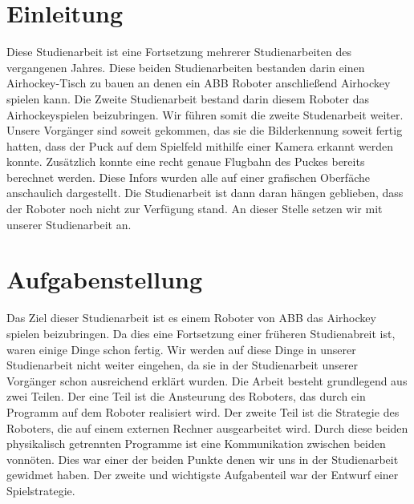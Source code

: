 
\chapter{Einleitung}
Diese Studienarbeit ist eine Fortsetzung mehrerer Studienarbeiten des vergangenen Jahres. Diese beiden Studienarbeiten bestanden darin einen Airhockey-Tisch zu bauen an denen ein ABB Roboter anschließend Airhockey spielen kann. Die Zweite Studienarbeit bestand darin diesem Roboter das Airhockeyspielen beizubringen. Wir führen somit die zweite Studenarbeit weiter. Unsere Vorgänger sind soweit gekommen, das sie die Bilderkennung soweit fertig hatten, dass der Puck auf dem Spielfeld mithilfe einer Kamera erkannt werden konnte. Zusätzlich konnte eine recht genaue Flugbahn des Puckes bereits berechnet werden. Diese Infors wurden alle auf einer grafischen Oberfäche anschaulich dargestellt. Die Studienarbeit ist dann daran hängen geblieben, dass der Roboter noch nicht zur Verfügung stand. An dieser Stelle setzen wir mit unserer Studienarbeit an.

\newpage

\chapter{Aufgabenstellung}
Das Ziel dieser Studienarbeit ist es einem Roboter von ABB das Airhockey spielen beizubringen. Da dies eine Fortsetzung einer früheren Studienabreit ist, waren einige Dinge schon fertig. Wir werden auf diese Dinge in unserer Studienarbeit nicht weiter eingehen, da sie in der Studienarbeit unserer Vorgänger schon ausreichend erklärt wurden. Die Arbeit besteht grundlegend aus zwei Teilen. Der eine Teil ist die Ansteurung des Roboters, das durch ein Programm auf dem Roboter realisiert wird. Der zweite Teil ist die Strategie des Roboters, die auf einem externen Rechner ausgearbeitet wird.
Durch diese beiden physikalisch getrennten Programme ist eine Kommunikation zwischen beiden vonnöten. Dies war einer der beiden Punkte denen wir uns in der Studienarbeit gewidmet haben. Der zweite und wichtigste Aufgabenteil war der Entwurf einer Spielstrategie. 

\newpage

